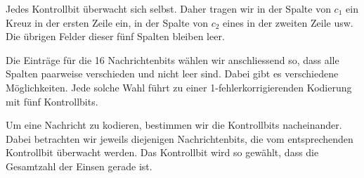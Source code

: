 Jedes Kontrollbit überwacht sich selbst. Daher tragen wir
in der Spalte von \(c_1\) ein Kreuz in der ersten Zeile ein,
in der Spalte von \(c_2\) eines in der zweiten Zeile usw.
Die übrigen Felder dieser fünf Spalten bleiben leer.

Die Einträge für die 16 Nachrichtenbits wählen wir
anschliessend so, dass alle Spalten paarweise verschieden
und nicht leer sind. Dabei gibt es verschiedene Möglichkeiten.
Jede solche Wahl führt zu einer 1-fehlerkorrigierenden
Kodierung mit fünf Kontrollbits.


\begin{center}
\end{center}


Um eine Nachricht zu kodieren, bestimmen wir die Kontrollbits
nacheinander. Dabei betrachten wir jeweils diejenigen
Nachrichtenbits, die vom entsprechenden Kontrollbit überwacht
werden. Das Kontrollbit wird so gewählt, dass die Gesamtzahl
der Einsen gerade ist.

